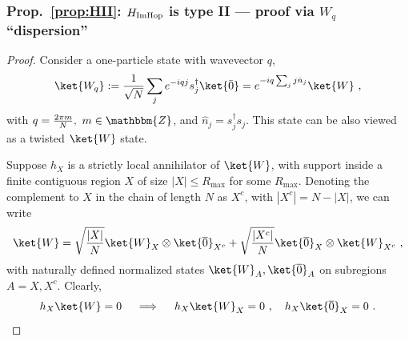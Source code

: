 \documentclass[prx,letterpaper,aps,superscriptaddress,floatfix,twocolumn,nofootinbib]{revtex4-2}
\theoremstyle{definition}
\newcommand{\defn}{:=}
\newcommand{\ktO}{\ket{\overline{0}}}
\newcommand{\ktW}{\ket{W}}
\begin{document}
\subsubsection{Prop.~\ref{prop:HII}: $H_{\rm ImHop}$ is type II --- proof via $W_q$ ``dispersion''}
\label{app:HImtypeII}
%
\begin{proof}
%
Consider a one-particle state with wavevector $q$,
\begin{equation}
\ket{W_q} 
\defn \frac{1}{\sqrt{N}} \sum_j e^{-i q j} s_j^\dagger \ket{\bar{0}}  
= e^{-i q \sum_j j \hat{n}_j} \ktW ~,
\end{equation}
with $q = \frac{2\pi m}{N},~ m \in \mathbbm{Z}$, and $\hat{n}_j = s_j^\dag s_j$.
%
This state can be also viewed as a twisted $\ktW$ state.

Suppose $h_X$ is a strictly local annihilator of $\ktW$, with support inside a finite contiguous region $X$ of size $|X| \leq R_{\text{max}}$ for some $R_{\text{max}}$.
%
Denoting the complement to $X$ in the chain of length $N$ as $X^c$, with $|X^c| = N - |X|$, we can write
\begin{equation}
\ktW = \sqrt{\frac{|X|}{N}} \ktW_X \otimes \ktO_{X^c} + \sqrt{\frac{|X^c|}{N}} \ktO_X \otimes \ktW_{X^c} ~,
\label{eq:WXXc}
\end{equation}
with naturally defined normalized states $\ktW_A, \ktO_A$ on subregions $A = X, X^c$.
Clearly,
\begin{equation}
h_X \ktW = 0 \quad \implies \quad h_X \ktW_X = 0~, \quad h_X \ktO_X = 0~.
\end{equation}


\end{proof}
\end{document}
